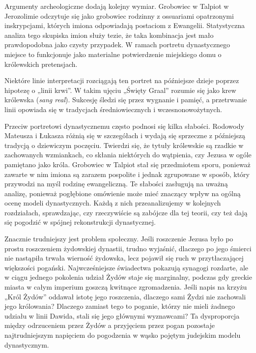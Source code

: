 Argumenty archeologiczne dodają kolejny wymiar.
Grobowiec w Talpiot w Jerozolimie odczytuje się jako grobowiec rodzinny z ossuariami opatrzonymi inskrypcjami, których imiona odpowiadają postaciom z Ewangelii.
Statystyczna analiza tego skupiska imion służy tezie, że taka kombinacja jest mało prawdopodobna jako czysty przypadek.
W ramach portretu dynastycznego miejsce to funkcjonuje jako materialne potwierdzenie miejskiego domu o królewskich pretensjach.

Niektóre linie interpretacji rozciągają ten portret na późniejsze dzieje poprzez hipotezę o „linii krwi”.
W takim ujęciu „Święty Graal” rozumie się jako krew królewska (\emph{sang real}).
Sukcesję śledzi się przez wygnanie i pamięć, a przetrwanie linii opowiada się w tradycjach średniowiecznych i wczesnonowożytnych.

Przeciw portretowi dynastycznemu często podnosi się kilka słabości.
Rodowody Mateusza i Łukasza różnią się w szczegółach i wydają się sprzeczne z późniejszą tradycją o dziewiczym poczęciu.
Twierdzi się, że tytuły królewskie są rzadkie w zachowanych wzmian­kach, co skłania niektórych do wątpienia, czy Jezusa w ogóle pamiętano jako króla.
Grobowiec w Talpiot stał się przedmiotem sporu, ponieważ zawarte w nim imiona są zarazem pospolite i jednak zgrupowane w sposób, który przywodzi na myśl rodzinę ewangeliczną.
Te słabości zasługują na uważną analizę, ponieważ pogłębione omówienie może mieć znaczący wpływ na ogólną ocenę modeli dynastycznych.
Każdą z nich przeanalizujemy w kolejnych rozdziałach, sprawdzając, czy rzeczywiście są zabójcze dla tej teorii, czy też dają się pogodzić w spójnej rekonstrukcji dynastycznej.

Znacznie trudniejszy jest problem społeczny.
Jeśli roszczenie Jezusa było po prostu roszczeniem żydowskiej dynastii, trudno wyjaśnić, dlaczego po jego śmierci nie nastąpiła trwała wierność żydowska, lecz pojawił się ruch w przytłaczającej większości pogański.
Najwcześniejsze świadectwa pokazują synagogi rozdarte, ale w ciągu jednego pokolenia udział Żydów staje się marginalny, podczas gdy greckie miasta w całym imperium goszczą kwitnące zgromadzenia.
Jeśli napis na krzyżu „Król Żydów” oddawał istotę jego roszczenia, dlaczego sami Żydzi nie zachowali jego królowania?
Dlaczego zamiast tego to poganie, którzy nie mieli żadnego udziału w linii Dawida, stali się jego głównymi wyznawcami?
Ta dysproporcja między odrzuceniem przez Żydów a przyjęciem przez pogan pozostaje najtrudniejszym napięciem do pogodzenia w wąsko pojętym judejskim modelu dynastycznym.

